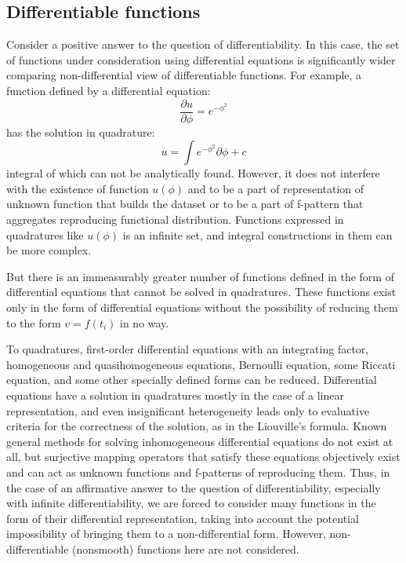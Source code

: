 \documentclass[a4paper, 11pt, oneside]{book}
\begin{document}
\subsection{Differentiable functions}
Consider a positive answer to the question of differentiability. In this case, the set of functions under consideration using differential equations is significantly wider comparing non-differential view of differentiable functions.
For example, a function defined by a differential equation:
\begin{equation}\label{diff-function-example}
  \frac{\partial u}{\partial \phi} = e^{\displaystyle -\phi^2}
\end{equation}
has the solution in quadrature:
\begin{equation}\label{integral-of-diff-function-example}
  u = \int e^{\displaystyle -\phi^2} \partial \phi + c
\end{equation}
integral of which can not be analytically found. However, it does not interfere with the existence of function $u(\phi)$ and to be a part of representation of unknown function that builds the dataset or to be a part of f-pattern that aggregates reproducing functional distribution. Functions expressed in quadratures like $u(\phi)$ is an infinite set, and integral constructions in them can be more complex.

But there is an immeasurably greater number of functions defined in the form of differential equations that cannot be solved in quadratures. These functions exist only in the form of differential equations without the possibility of reducing them to the form $v = f({t_i})$ in no way.

To quadratures, first-order differential equations with an integrating factor, homogeneous and quasihomogeneous equations, Bernoulli equation, some Riccati equation, and some other specially defined forms can be reduced. Differential equations have a solution in quadratures mostly in the case of a linear representation, and even insignificant heterogeneity leads only to evaluative criteria for the correctness of the solution, as in the Liouville's formula. Known general methods for solving inhomogeneous differential equations do not exist at all, but surjective mapping operators that satisfy these equations objectively exist and can act as unknown functions and f-patterns of reproducing them.
Thus, in the case of an affirmative answer to the question of differentiability, especially with infinite differentiability, we are forced to consider many functions in the form of their differential representation, taking into account the potential impossibility of bringing them to a non-differential form. However, non-differentiable (nonsmooth) functions here are not considered.
\end{document}
